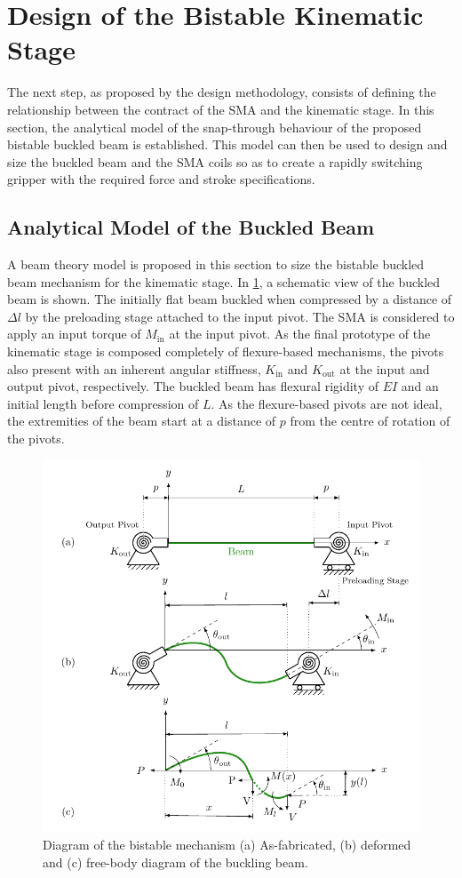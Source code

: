 \section{Design of the Bistable Kinematic Stage}
The next step, as proposed by the design methodology, consists of defining the relationship between the contract of the SMA and the kinematic stage. In this section, the analytical model of the snap-through behaviour of the proposed bistable buckled beam is established. This model can then be used to design and size the buckled beam and the SMA coils so as to create a rapidly switching gripper with the required force and stroke specifications.
\subsection{Analytical Model of the Buckled Beam}
A beam theory model is proposed in this section to size the bistable buckled beam mechanism for the kinematic stage. In \cref{fig:buckled-beam-schematic}, a schematic view of the buckled beam is shown. The initially flat beam buckled when compressed by a distance of $\Delta l$ by the preloading stage attached to the input pivot. The SMA is considered to apply an input torque of $M_\mathrm{in}$ at the input pivot. As the final prototype of the kinematic stage is composed completely of flexure-based mechanisms, the pivots also present with an inherent angular stiffness, $K_\mathrm{in}$ and $K_\mathrm{out}$ at the input and output pivot, respectively. The buckled beam has  flexural rigidity of $EI$ and an initial length before compression of $L$. As the flexure-based pivots are not ideal, the extremities of the beam start at a distance of $p$ from the centre of rotation of the pivots.
\begin{figure}[hbt!] %
  \centering
  \includegraphics[width=0.8\columnwidth]{images/chap6/buckled-beam-schematic-old.pdf}
  \caption[Diagram of the bistable mechanism]{Diagram of the bistable mechanism (a) As-fabricated, (b) deformed and (c) free-body diagram of the buckling beam.}
  \label{fig:buckled-beam-schematic}
\end{figure}

